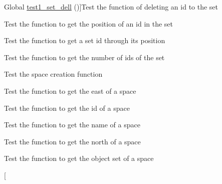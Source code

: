 \begin{DoxyRefList}
Global \hyperlink{set__test_8c_af36fe01c5b5a8c7c58706f7fe4841d27}{test1\+\_\+set\+\_\+dell} ()]Test the function of deleting an id to the set  
\item[\label{test__test000147}%
\Hypertarget{test__test000147}%
Global \hyperlink{set__test_8c_a67852c621c997ab9a5b1ad30f7bf9f1b}{test1\+\_\+set\+\_\+find\+\_\+index} ()]Test the function to get the position of an id in the set  
\item[\label{test__test000149}%
\Hypertarget{test__test000149}%
Global \hyperlink{set__test_8c_a7dbb3115868eefb7e52d606f05e3187e}{test1\+\_\+set\+\_\+get\+\_\+id\+\_\+at\+\_\+position} ()]Test the function to get a set id through its position  
\item[\label{test__test000145}%
\Hypertarget{test__test000145}%
Global \hyperlink{set__test_8c_ae1ad6c5f19a1a960ae5ccfa970c3d285}{test1\+\_\+set\+\_\+get\+\_\+num} ()]Test the function to get the number of ids of the set  
\item[\label{test__test000151}%
\Hypertarget{test__test000151}%
Global \hyperlink{space__test_8c_a69278cc022dc5688d4725f8d36317b30}{test1\+\_\+space\+\_\+create} ()]Test the space creation function  
\item[\label{test__test000174}%
\Hypertarget{test__test000174}%
Global \hyperlink{space__test_8c_a354adb2722b06ec65b7212d2736d6417}{test1\+\_\+space\+\_\+get\+\_\+east} ()]Test the function to get the east of a space  
\item[\label{test__test000178}%
\Hypertarget{test__test000178}%
Global \hyperlink{space__test_8c_a920df9e02482f4f1e6a5ebcaec523860}{test1\+\_\+space\+\_\+get\+\_\+id} ()]Test the function to get the id of a space  
\item[\label{test__test000166}%
\Hypertarget{test__test000166}%
Global \hyperlink{space__test_8c_ad12c42523c517507566c5c68b1527689}{test1\+\_\+space\+\_\+get\+\_\+name} ()]Test the function to get the name of a space  
\item[\label{test__test000170}%
\Hypertarget{test__test000170}%
Global \hyperlink{space__test_8c_a3a87f1e1e173d622bfbd3bcd14e060ca}{test1\+\_\+space\+\_\+get\+\_\+north} ()]Test the function to get the north of a space  
\item[\label{test__test000168}%
\Hypertarget{test__test000168}%
Global \hyperlink{space__test_8c_a4a1ca89fa511c04bb07c14edb19c17ba}{test1\+\_\+space\+\_\+get\+\_\+object} ()]Test the function to get the object set of a space  
\item[\label{test__test000172}%
%

\end{DoxyRefList}
